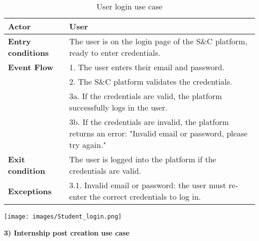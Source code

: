 \begin{table}[h!]
    \centering
    \begin{tabular}{lp{10cm}}
        \textbf{Actor} & User \\ \hline
        \textbf{Entry conditions} & The user is on the login page of the S\&C platform, ready to enter credentials. \\ \hline
        \textbf{Event Flow} & 
        1. The user enters their email and password. \\
        & 2. The S\&C platform validates the credentials. \\
        & 3a. If the credentials are valid, the platform successfully logs in the user. \\
        & 3b. If the credentials are invalid, the platform returns an error: "Invalid email or password, please try again." \\
        \hline
        \textbf{Exit condition} & The user is logged into the platform if the credentials are valid. \\ \hline
        \textbf{Exceptions} & 
        3.1. Invalid email or password: the user must re-enter the correct credentials to log in. \\
    \end{tabular}
    \caption{User login use case}
    \label{tab:user_login}
\end{table}


\begin{center}
    \texttt{[image: images/Student\_login.png]}
\end{center}

\newpage
\textbf{3) Internship post creation use case}\\

